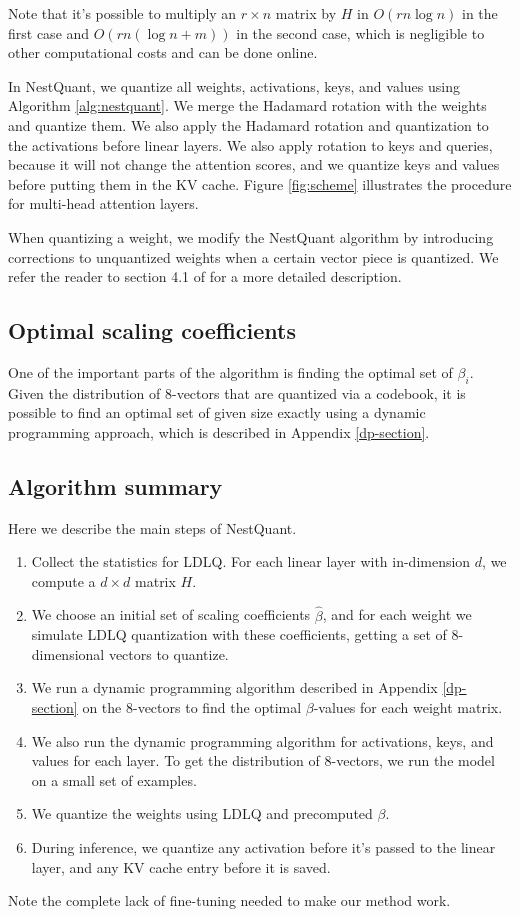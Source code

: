 Note that it's possible to multiply an $r \times n$ matrix by $H$ in $O(rn \log n)$ in the first case and $O(rn(\log n + m))$ in the second case, which is negligible to other computational costs and can be done online.

In NestQuant, we quantize all weights, activations, keys, and values using Algorithm \ref{alg:nestquant}. We merge the Hadamard rotation with the weights and quantize them. We also apply the Hadamard rotation and quantization to the activations before linear layers. We also apply rotation to keys and queries, because it will not change the attention scores, and we quantize keys and values before putting them in the KV cache. Figure \ref{fig:scheme} illustrates the procedure for multi-head attention layers.

When quantizing a weight, we modify the NestQuant algorithm by introducing corrections to unquantized weights when a certain vector piece is quantized. We refer the reader to section 4.1 of \cite{tseng2024} for a more detailed description.

\subsection{Optimal scaling coefficients}

One of the important parts of the algorithm is finding the optimal set of $\beta_i$. Given the distribution of 8-vectors that are quantized via a codebook, it is possible to find an optimal set of given size exactly using a dynamic programming approach, which is described in Appendix \ref{dp-section}.

\subsection{Algorithm summary}
\label{algo-summary}

Here we describe the main steps of NestQuant.

\begin{enumerate}
    \item Collect the statistics for LDLQ. For each linear layer with in-dimension $d$, we compute a $d \times d$ matrix $H$.
    \item We choose an initial set of scaling coefficients $\hat{\beta}$, and for each weight we simulate LDLQ quantization with these coefficients, getting a set of 8-dimensional vectors to quantize.
    \item We run a dynamic programming algorithm described in Appendix \ref{dp-section} on the 8-vectors to find the optimal $\beta$-values for each weight matrix.
    \item We also run the dynamic programming algorithm for activations, keys, and values for each layer. To get the distribution of 8-vectors, we run the model on a small set of examples.
    \item We quantize the weights using LDLQ and precomputed $\beta$.
    \item During inference, we quantize any activation before it's passed to the linear layer, and any KV cache entry before it is saved.
\end{enumerate}
Note the complete lack of fine-tuning needed to make our method work.